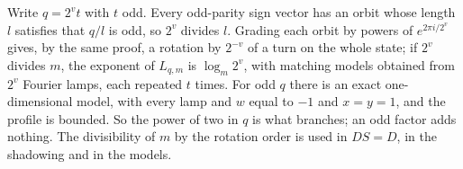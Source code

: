 \begin{remark}\label{rem:lamp-arithmetic}
Write $q=2^vt$ with $t$ odd. Every odd-parity sign vector has an orbit whose length $l$ satisfies that $q/l$ is odd, so $2^v$
divides $l$. Grading each orbit by powers of $e^{2\pi i/2^v}$ gives, by the same proof, a rotation by $2^{-v}$ of a turn on the
whole state; if $2^v$ divides $m$, the exponent of $L_{q,m}$ is $\log_m2^v$, with matching models obtained from $2^v$ Fourier
lamps, each repeated $t$ times. For odd $q$ there is an exact one-dimensional model, with every lamp and $w$ equal to $-1$ and
$x=y=1$, and the profile is bounded. So the power of two in $q$ is what branches; an odd factor adds nothing. The
divisibility of $m$ by the rotation order is used in $DS=D$, in the shadowing and in the models.
\end{remark}


